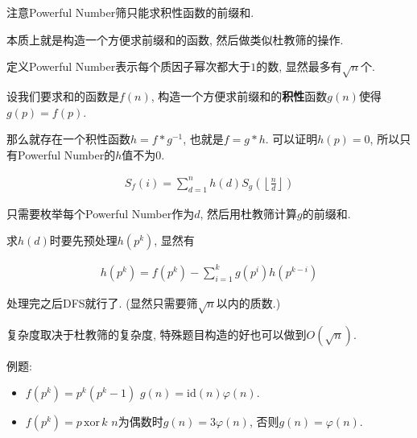 注意Powerful Number筛只能求积性函数的前缀和.

本质上就是构造一个方便求前缀和的函数, 然后做类似杜教筛的操作.

定义Powerful Number表示每个质因子幂次都大于$1$的数, 显然最多有$\sqrt n$个.

设我们要求和的函数是$f(n)$, 构造一个方便求前缀和的\textbf{积性}函数$g(n)$使得$g(p) = f(p)$.

那么就存在一个积性函数$h = f * g ^ {-1}$, 也就是$f = g *h$. 可以证明$h(p) = 0$, 所以只有Powerful Number的$h$值不为0.

$$ \begin{aligned}
	S_f(i) = \sum_{d = 1} ^ n h(d) S_g \left( \left\lfloor \frac n d \right\rfloor \right)
\end{aligned} $$

只需要枚举每个Powerful Number作为$d$, 然后用杜教筛计算$g$的前缀和.

求$h(d)$时要先预处理$h(p^k)$, 显然有

$$ \begin{aligned}
	h \left(p ^ k \right) = f \left(p ^ k \right) - \sum_{i = 1} ^ k g \left( p ^ i \right) h \left( p ^ {k - i} \right)
\end{aligned} $$

处理完之后DFS就行了. (显然只需要筛$\sqrt n$以内的质数.)

复杂度取决于杜教筛的复杂度, 特殊题目构造的好也可以做到$O \left( \sqrt n \right)$.

例题:

\begin{itemize}
	\item $f \left( p ^ k \right) = p ^ k \left( p ^ k - 1 \right)$
		\subitem $g(n) = \text{id}(n) \varphi(n)$.
	\item $f \left( p ^ k \right) = p \, \text{xor} \, k$
		\subitem $n$为偶数时$g(n) = 3 \varphi(n)$, 否则$g(n) = \varphi(n)$.
\end{itemize}